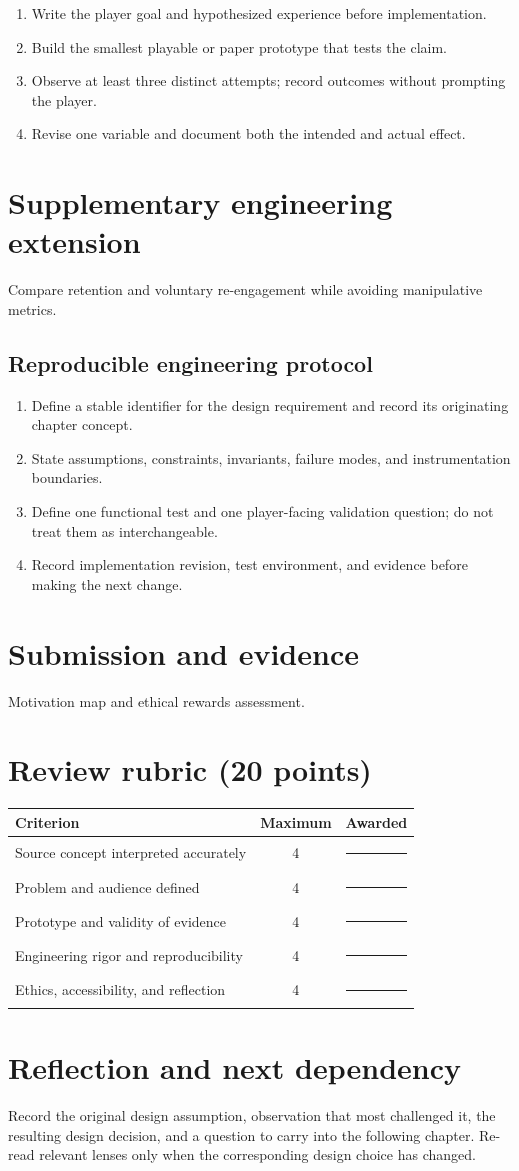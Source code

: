 \documentclass[11pt]{article}
\begin{document}
\begin{enumerate}
\item Write the player goal and hypothesized experience before implementation.
\item Build the smallest playable or paper prototype that tests the claim.
\item Observe at least three distinct attempts; record outcomes without prompting the player.
\item Revise one variable and document both the intended and actual effect.
\end{enumerate}

\section{Supplementary engineering extension}
Compare retention and voluntary re-engagement while avoiding manipulative metrics.


\subsection{Reproducible engineering protocol}
\begin{enumerate}
\item Define a stable identifier for the design requirement and record its originating chapter concept.
\item State assumptions, constraints, invariants, failure modes, and instrumentation boundaries.
\item Define one functional test and one player-facing validation question; do not treat them as interchangeable.
\item Record implementation revision, test environment, and evidence before making the next change.
\end{enumerate}

\section{Submission and evidence}
Motivation map and ethical rewards assessment.


\section{Review rubric (20 points)}
\begin{tabularx}{\linewidth}{@{}Xcc@{}}\toprule
Criterion & Maximum & Awarded \\ \midrule
Source concept interpreted accurately & 4 & \rule{0.45in}{0.4pt}\\
Problem and audience defined & 4 & \rule{0.45in}{0.4pt}\\
Prototype and validity of evidence & 4 & \rule{0.45in}{0.4pt}\\
Engineering rigor and reproducibility & 4 & \rule{0.45in}{0.4pt}\\
Ethics, accessibility, and reflection & 4 & \rule{0.45in}{0.4pt}\\\bottomrule
\end{tabularx}

\section{Reflection and next dependency}
Record the original design assumption, observation that most challenged it, the resulting design decision, and a question to carry into the following chapter. Re-read relevant lenses only when the corresponding design choice has changed.
\end{document}
